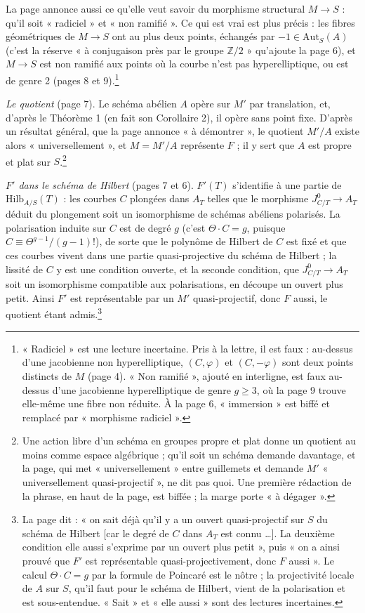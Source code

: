 \documentclass[11pt,a4paper]{article}
\begin{document}
La page annonce aussi ce qu'elle veut savoir du morphisme structural
$M \to S$ : qu'il soit « radiciel » et « non ramifié ». Ce qui est vrai est
plus précis : les fibres géométriques de $M \to S$ ont au plus deux points,
échangés par $-1 \in \mathrm{Aut}_{S}(A)$ (c'est la réserve « à conjugaison
près par le groupe $\mathbb{Z}/2$ » qu'ajoute la page 6), et $M \to S$ est
non ramifié aux points où la courbe n'est pas hyperelliptique, ou est de
genre 2 (pages 8 et 9).\footnote{« Radiciel » est une lecture incertaine. Pris
à la lettre, il est faux : au-dessus d'une jacobienne non hyperelliptique,
$(C, \varphi)$ et $(C, -\varphi)$ sont deux points distincts de $M$ (page 4).
« Non ramifié », ajouté en interligne, est faux au-dessus d'une jacobienne
hyperelliptique de genre $g \geq 3$, où la page 9 trouve elle-même une fibre
non réduite. À la page 6, « immersion » est biffé et remplacé par « morphisme
radiciel ».}

\emph{Le quotient} (page 7). Le schéma abélien $A$ opère sur $M'$ par
translation, et, d'après le Théorème 1 (en fait son Corollaire 2), il
opère sans point fixe. D'après un résultat général, que la page annonce « à
démontrer », le quotient $M'/A$ existe alors « universellement », et
$M = M'/A$ représente $F$ ; il y sert que $A$ est propre et plat sur
$S$.\footnote{Une action libre d'un schéma en groupes propre et plat donne un
quotient au moins comme espace algébrique ; qu'il soit un schéma demande
davantage, et la page, qui met « universellement » entre guillemets et
demande $M'$ « universellement quasi-projectif », ne dit pas quoi. Une
première rédaction de la phrase, en haut de la page, est biffée ; la marge
porte « à dégager ».}

\emph{$F'$ dans le schéma de Hilbert} (pages 7 et 6). $F'(T)$ s'identifie à
une partie de $\mathrm{Hilb}_{A/S}(T)$ : les courbes $C$ plongées dans
$A_{T}$ telles que le morphisme $J^{0}_{C/T} \to A_{T}$ déduit du plongement
soit un isomorphisme de schémas abéliens polarisés. La polarisation induite
sur $C$ est de degré $g$ (c'est $\Theta \cdot C = g$, puisque
$C \equiv \Theta^{g-1}/(g-1)!$), de sorte que le polynôme de Hilbert de $C$
est fixé et que ces courbes vivent dans une partie quasi-projective du schéma
de Hilbert ; la lissité de $C$ y est une condition ouverte, et la seconde
condition, que $J^{0}_{C/T} \to A_{T}$ soit un isomorphisme compatible aux
polarisations, en découpe un ouvert plus petit. Ainsi $F'$ est représentable
par un $M'$ quasi-projectif, donc $F$ aussi, le quotient étant
admis.\footnote{La page dit : « on sait déjà qu'il y a un ouvert
quasi-projectif sur $S$ du schéma de Hilbert [car le degré de $C$ dans
$A_{T}$ est connu …]. La deuxième condition elle aussi s'exprime par un
ouvert plus petit », puis « on a ainsi prouvé que $F'$ est représentable
quasi-projectivement, donc $F$ aussi ». Le calcul $\Theta \cdot C = g$ par la
formule de Poincaré est le nôtre ; la projectivité locale de $A$ sur $S$,
qu'il faut pour le schéma de Hilbert, vient de la polarisation et est
sous-entendue. « Sait » et « elle aussi » sont des lectures incertaines.}
\end{document}
